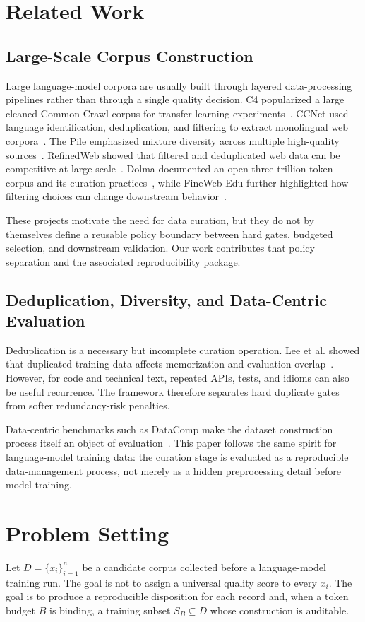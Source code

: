 \documentclass[conference]{IEEEtran}
\begin{document}
\section{Related Work}
\subsection{Large-Scale Corpus Construction}
Large language-model corpora are usually built through layered data-processing
pipelines rather than through a single quality decision.  C4 popularized a
large cleaned Common Crawl corpus for transfer learning experiments~\cite{c4}.
CCNet used language identification, deduplication, and filtering to extract
monolingual web corpora~\cite{ccnet}.  The Pile emphasized mixture diversity
across multiple high-quality sources~\cite{pile}.  RefinedWeb showed that
filtered and deduplicated web data can be competitive at large scale~\cite{refinedweb}.
Dolma documented an open three-trillion-token corpus and its curation
practices~\cite{dolma}, while FineWeb-Edu further highlighted how filtering
choices can change downstream behavior~\cite{finewebedu}.

These projects motivate the need for data curation, but they do not by
themselves define a reusable policy boundary between hard gates, budgeted
selection, and downstream validation.  Our work contributes that policy
separation and the associated reproducibility package.

\subsection{Deduplication, Diversity, and Data-Centric Evaluation}
Deduplication is a necessary but incomplete curation operation.  Lee et
al. showed that duplicated training data affects memorization and evaluation
overlap~\cite{dedup}.  However, for code and technical text, repeated APIs,
tests, and idioms can also be useful recurrence.  The framework therefore
separates hard duplicate gates from softer redundancy-risk penalties.

Data-centric benchmarks such as DataComp make the dataset construction process
itself an object of evaluation~\cite{datacomp}.  This paper follows the same
spirit for language-model training data: the curation stage is evaluated as a
reproducible data-management process, not merely as a hidden preprocessing
detail before model training.

\section{Problem Setting}
Let $D=\{x_i\}_{i=1}^{n}$ be a candidate corpus collected before a language-model
training run.  The goal is not to assign a universal quality score to every
$x_i$.  The goal is to produce a reproducible disposition for each record and,
when a token budget $B$ is binding, a training subset $S_B \subseteq D$ whose
construction is auditable.
\end{document}
